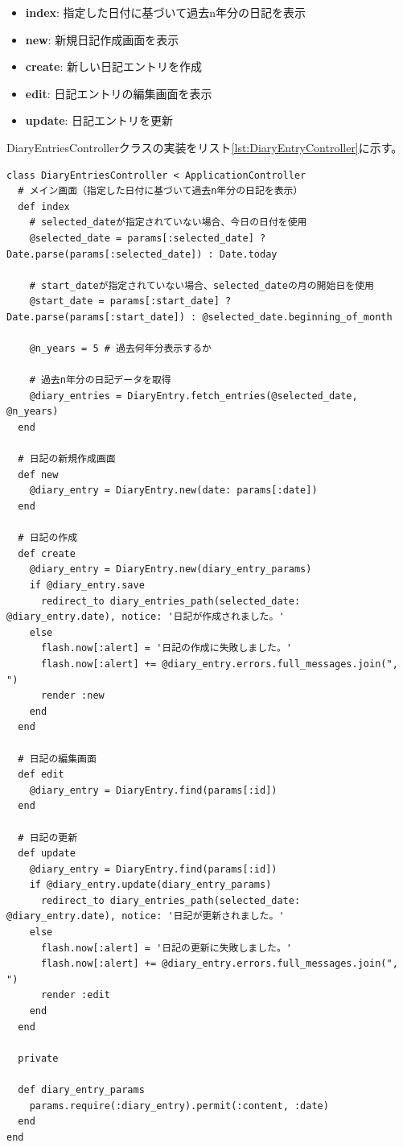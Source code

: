 \documentclass[dvipdfmx,fleqn,article]{jlreq}
\begin{document}
\begin{itemize}
    \item \textbf{index}: 指定した日付に基づいて過去n年分の日記を表示
    \item \textbf{new}: 新規日記作成画面を表示
    \item \textbf{create}: 新しい日記エントリを作成
    \item \textbf{edit}: 日記エントリの編集画面を表示
    \item \textbf{update}: 日記エントリを更新
\end{itemize}

DiaryEntriesControllerクラスの実装をリスト\ref{lst:DiaryEntryController}に示す。
\begin{lstlisting}[language=CSharp, caption=DiaryEntryControllerクラス, label={lst:DiaryEntryController}]
  class DiaryEntriesController < ApplicationController
  # メイン画面（指定した日付に基づいて過去n年分の日記を表示）
  def index
    # selected_dateが指定されていない場合、今日の日付を使用
    @selected_date = params[:selected_date] ? Date.parse(params[:selected_date]) : Date.today
  
    # start_dateが指定されていない場合、selected_dateの月の開始日を使用
    @start_date = params[:start_date] ? Date.parse(params[:start_date]) : @selected_date.beginning_of_month
  
    @n_years = 5 # 過去何年分表示するか
  
    # 過去n年分の日記データを取得
    @diary_entries = DiaryEntry.fetch_entries(@selected_date, @n_years)
  end

  # 日記の新規作成画面
  def new
    @diary_entry = DiaryEntry.new(date: params[:date])
  end

  # 日記の作成
  def create
    @diary_entry = DiaryEntry.new(diary_entry_params)
    if @diary_entry.save
      redirect_to diary_entries_path(selected_date: @diary_entry.date), notice: '日記が作成されました。'
    else
      flash.now[:alert] = '日記の作成に失敗しました。'
      flash.now[:alert] += @diary_entry.errors.full_messages.join(", ")
      render :new
    end
  end

  # 日記の編集画面
  def edit
    @diary_entry = DiaryEntry.find(params[:id])
  end

  # 日記の更新
  def update
    @diary_entry = DiaryEntry.find(params[:id])
    if @diary_entry.update(diary_entry_params)
      redirect_to diary_entries_path(selected_date: @diary_entry.date), notice: '日記が更新されました。'
    else
      flash.now[:alert] = '日記の更新に失敗しました。'
      flash.now[:alert] += @diary_entry.errors.full_messages.join(", ")
      render :edit
    end
  end

  private

  def diary_entry_params
    params.require(:diary_entry).permit(:content, :date)
  end
end
\end{lstlisting}
\end{document}

